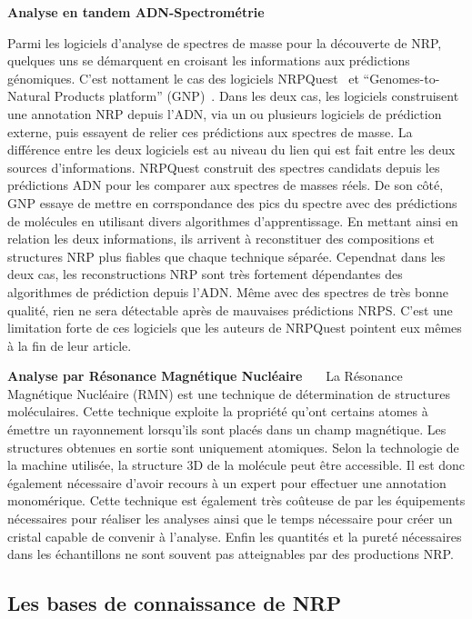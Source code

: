 \textbf{Analyse en tandem ADN-Spectrométrie}~~~

Parmi les logiciels d'analyse de spectres de masse pour la découverte de NRP, quelques uns se démarquent en croisant les informations aux prédictions génomiques.
C'est nottament le cas des logiciels NRPQuest~\cite{mohimani_nrpquest:_2014} et ``Genomes-to-Natural Products platform'' (GNP)~\cite{johnston_automated_2015}.
Dans les deux cas, les logiciels construisent une annotation NRP depuis l'ADN, via un ou plusieurs logiciels de prédiction externe, puis essayent de relier ces prédictions aux spectres de masse.
La différence entre les deux logiciels est au niveau du lien qui est fait entre les deux sources d'informations.
NRPQuest construit des spectres candidats depuis les prédictions ADN pour les comparer aux spectres de masses réels.
De son côté, GNP essaye de mettre en corrspondance des pics du spectre avec des prédictions de molécules en utilisant divers algorithmes d'apprentissage.
En mettant ainsi en relation les deux informations, ils arrivent à reconstituer des compositions et structures NRP plus fiables que chaque technique séparée.
Cependnat dans les deux cas, les reconstructions NRP sont très fortement dépendantes des algorithmes de prédiction depuis l'ADN.
Même avec des spectres de très bonne qualité, rien ne sera détectable après de mauvaises prédictions NRPS.
C'est une limitation forte de ces logiciels que les auteurs de NRPQuest pointent eux mêmes à la fin de leur article.



\textbf{Analyse par Résonance Magnétique Nucléaire}~~~
La Résonance Magnétique Nucléaire (RMN) est une technique de détermination de structures moléculaires.
Cette technique exploite la propriété qu'ont certains atomes à émettre un rayonnement lorsqu'ils sont placés dans un champ magnétique.
Les structures obtenues en sortie sont uniquement atomiques.
Selon la technologie de la machine utilisée, la structure 3D de la molécule peut être accessible.
Il est donc également nécessaire d'avoir recours à un expert pour effectuer une annotation monomérique.
Cette technique est également très coûteuse de par les équipements nécessaires pour réaliser les analyses ainsi que le temps nécessaire pour créer un cristal capable de convenir à l'analyse.
Enfin les quantités et la pureté nécessaires dans les échantillons ne sont souvent pas atteignables par des productions NRP.



\subsection{Les bases de connaissance de NRP}


